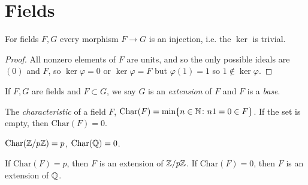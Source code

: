 \documentclass[a4paper,twoside,master.tex]{subfiles}
\begin{document}
\section{Fields}\label{sec:fields}

For fields $ F,G $ every morphism $ F \to G $ is an injection, i.e. the $ \ker $ is trivial.

\begin{proof}
    All nonzero elements of $ F $ are units, and so the only possible ideals are $ (0) $ and $ F $, so $ \ker \varphi = 0 $ or $ \ker \varphi = F $ but $ \varphi(1) = 1 $ so $ 1 \notin \ker \varphi $. 
\end{proof}

\begin{definition}
    If $ F,G $ are fields and $ F\subset G $, we say $ G $ is an \textit{extension} of $ F $ and $ F $ is a \textit{base}.
\end{definition}

\begin{definition}
    The \textit{characteristic} of a field $ F $, $ \text{Char}(F) = \min \{n \in \mathbb{N}\colon n1 = 0 \in F\} $. If the set is empty, then $ \text{Char}(F) = 0 $.
\end{definition}

\begin{ex}
    $ \text{Char}(\mathbb{Z}/p\mathbb{Z}) = p $, $ \text{Char}(\mathbb{Q}) = 0 $.
\end{ex}

If $ \text{Char}(F) = p $, then $ F $ is an extension of $ \mathbb{Z}/p\mathbb{Z} $. If $ \text{Char}(F) = 0 $, then $ F $ is an extension of $ \mathbb{Q} $. 
\end{document}
